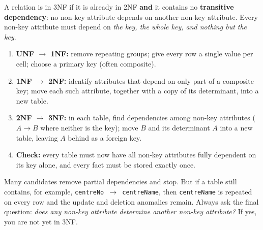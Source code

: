 \documentclass[11pt]{article}
\newcommand{\cle}[1]{{\popxbold\color{popdark}#1}}
\begin{document}
\begin{definition}
A relation is in \cle{3NF} if it is already in 2NF \textbf{and} it contains no \textbf{transitive dependency}: no non-key attribute depends on another non-key attribute. Every non-key attribute must depend on \emph{the key, the whole key, and nothing but the key}.
\end{definition}

\begin{methode}
\begin{enumerate}
\item \textbf{UNF $\to$ 1NF:} remove repeating groups; give every row a single value per cell; choose a primary key (often composite).
\item \textbf{1NF $\to$ 2NF:} identify attributes that depend on only part of a composite key; move each such attribute, together with a copy of its determinant, into a new table.
\item \textbf{2NF $\to$ 3NF:} in each table, find dependencies among non-key attributes ($A \to B$ where neither is the key); move $B$ and its determinant $A$ into a new table, leaving $A$ behind as a foreign key.
\item \textbf{Check:} every table must now have all non-key attributes fully dependent on its key alone, and every fact must be stored exactly once.
\end{enumerate}
\end{methode}

\begin{attention}
Many candidates remove partial dependencies and stop. But if a table still contains, for example, \texttt{centreNo $\to$ centreName}, then \texttt{centreName} is repeated on every row and the update and deletion anomalies remain. Always ask the final question: \emph{does any non-key attribute determine another non-key attribute?} If yes, you are not yet in 3NF.
\end{attention}
\end{document}
